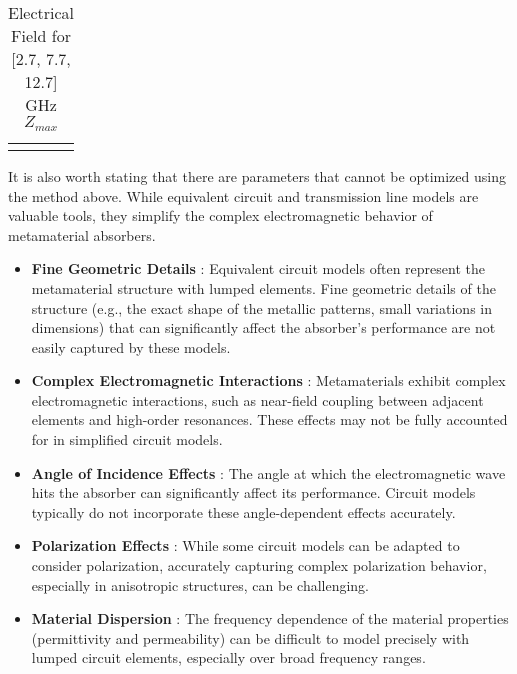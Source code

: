 \begin{landscape}
\begin{table}
\begin{tabular}{ccc}
\begin{tikzpicture}
\begin{axis}
                            \addlegendentry{$\Re{(S_{11})}$}
                            \addlegendentry{$\Im{(S_{11})}$}
    
                        \end{axis}
                    \end{tikzpicture}
    
                \end{tabular}
                \caption{Electrical Field for [2.7, 7.7, 12.7] GHz $Z_{max}$}
                \label{table:Optimized}
            \end{table}
        \end{landscape}

        
        It is also worth stating that there are parameters that cannot be optimized using the
        method above. While equivalent circuit and transmission line models are valuable tools, 
        they simplify the complex electromagnetic behavior of metamaterial absorbers. 

        \begin{itemize}
            \item \textbf{Fine Geometric Details} : Equivalent circuit models often represent the 
                metamaterial structure with lumped elements. Fine geometric details of the 
                structure (e.g., the exact shape of the metallic patterns, small variations in
                dimensions) that can significantly affect the absorber's performance are not 
                easily captured by these models.
            \item \textbf{Complex Electromagnetic Interactions} : Metamaterials exhibit complex
                electromagnetic interactions, such as near-field coupling between adjacent 
                elements and high-order resonances. These effects may not be fully accounted for 
                in simplified circuit models.
            \item \textbf{Angle of Incidence Effects} : The angle at which the electromagnetic 
                wave hits the absorber can significantly affect its performance. Circuit models
                typically do not incorporate these angle-dependent effects accurately.
            \item \textbf{Polarization Effects} : While some circuit models can be adapted to 
                consider polarization, accurately capturing complex polarization behavior, 
                especially in anisotropic structures, can be challenging.
            \item \textbf{Material Dispersion} : The frequency dependence of the material 
                properties (permittivity and permeability) can be difficult to model precisely 
                with lumped circuit elements, especially over broad frequency ranges.
        \end{itemize}

